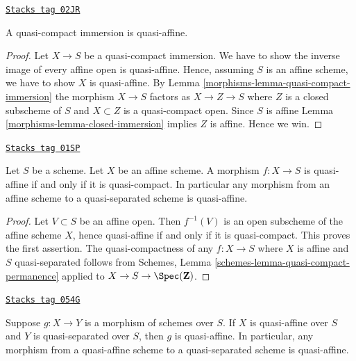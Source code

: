 \begin{lemma}
\label{morphisms-lemma-quasi-compact-immersion-quasi-affine}
\href{https://stacks.math.columbia.edu/tag/02JR}{\texttt{Stacks tag 02JR}}

A quasi-compact immersion is quasi-affine.
\end{lemma}

\begin{proof}

Let $X \to S$ be a quasi-compact immersion. We have to show the
inverse image of every affine open is quasi-affine. Hence,
assuming $S$ is an affine scheme, we have to show
$X$ is quasi-affine. By Lemma \ref{morphisms-lemma-quasi-compact-immersion}
the morphism $X \to S$ factors as $X \to Z \to S$ where $Z$ is a closed
subscheme of $S$ and $X \subset Z$ is a quasi-compact open.
Since $S$ is affine Lemma \ref{morphisms-lemma-closed-immersion} implies
$Z$ is affine. Hence we win.
\end{proof}

\begin{lemma}
\label{morphisms-lemma-affine-quasi-affine}
\href{https://stacks.math.columbia.edu/tag/01SP}{\texttt{Stacks tag 01SP}}

Let $S$ be a scheme. Let $X$ be an affine scheme.
A morphism $f : X \to S$ is quasi-affine if and only if it is quasi-compact.
In particular any morphism from an affine scheme to a quasi-separated
scheme is quasi-affine.
\end{lemma}

\begin{proof}
Let $V \subset S$ be an affine open. Then $f^{-1}(V)$ is an open subscheme
of the affine scheme $X$, hence quasi-affine if and only if it is
quasi-compact. This proves the first assertion. The quasi-compactness of any
$f : X \to S$ where $X$ is affine and $S$ quasi-separated follows from
Schemes, Lemma \ref{schemes-lemma-quasi-compact-permanence}
applied to $X \to S \to \Spec(\mathbf{Z})$.
\end{proof}

\begin{lemma}
\label{morphisms-lemma-quasi-affine-permanence}
\href{https://stacks.math.columbia.edu/tag/054G}{\texttt{Stacks tag 054G}}

Suppose $g : X \to Y$ is a morphism of schemes over $S$.
If $X$ is quasi-affine over $S$ and $Y$ is quasi-separated over $S$,
then $g$ is quasi-affine. In particular, any morphism from a
quasi-affine scheme to a quasi-separated scheme is quasi-affine.
\end{lemma}


